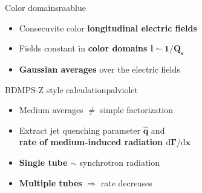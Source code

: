 \documentclass[aspectratio=169,11pt,usenames,dvipsnames]{beamer}
\begin{document}
\begin{frame}[noframenumbering]
\begin{center}
\begin{columns}[onlytextwidth,t]
            \begin{center}
                \begin{custombox2}{\normalsize Color domains}{raablue}
                    \small
                    \begin{varwidth}{0.89\textwidth}
                    \begin{itemize}\itemsep0em 
                        \itemsep0em
                        \footnotesize
                        \item Consecuvite color {\bfseries\color{raablue}longitudinal electric fields}
                        \item Fields constant in {\bfseries\color{jyured}color domains $\boldsymbol{l\sim 1/Q_s}$}
                        \item {\bfseries\color{raablue} Gaussian averages} over the electric fields
                    \end{itemize}
                    \end{varwidth}
                \end{custombox2}
                \begin{custombox2}{\normalsize BDMPS-Z style calculation}{palviolet}
                    \small
                    \begin{varwidth}{0.89\textwidth}
                    \begin{itemize}\itemsep0em 
                        \itemsep0em
                        \footnotesize
                        \item Medium averages $\neq$ simple factorization
                        \item Extract jet quenching parameter $\boldsymbol{\hat{q}}$ and \\{\bfseries\color{palviolet} rate of medium-induced radiation $\boldsymbol{\mathrm{d}\Gamma/\mathrm{d}x}$}
                        \item {\bfseries\color{raablue}Single tube} $\sim$ synchrotron radiation 
                        \item {\bfseries\color{raablue}Multiple tubes} $\Rightarrow$ rate decreases
                    \end{itemize}

\end{varwidth}
\end{custombox2}
\end{center}
\end{columns}
\end{center}
\end{frame}
\end{document}
